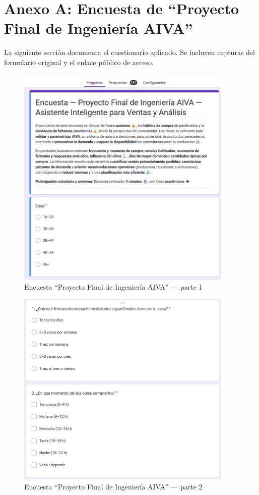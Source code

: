 
\section{Anexo A: Encuesta de “Proyecto Final de Ingeniería AIVA”}
La siguiente sección documenta el cuestionario aplicado. Se incluyen
capturas del formulario original y el enlace público de acceso.

\begin{figure}[p]
  \centering
  \includegraphics[width=0.92\textwidth]{images/encuesta_p1.png} %
  \caption{Encuesta “Proyecto Final de Ingeniería AIVA” — parte 1}
  \label{fig:encuesta-aiva-1}
\end{figure}

\begin{figure}[p]
  \centering
  \includegraphics[width=0.92\textwidth]{images/encuesta_p2.png} %
  \caption{Encuesta “Proyecto Final de Ingeniería AIVA” — parte 2}
  \label{fig:encuesta-aiva-2}
\end{figure}

